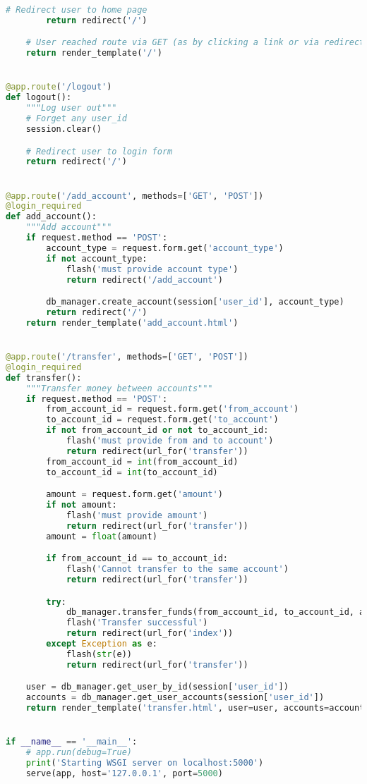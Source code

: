\begin{lstlisting}[language=Python]
		# Redirect user to home page
		return redirect('/')

	# User reached route via GET (as by clicking a link or via redirect)
	return render_template('/')


@app.route('/logout')
def logout():
	"""Log user out"""
	# Forget any user_id
	session.clear()

	# Redirect user to login form
	return redirect('/')


@app.route('/add_account', methods=['GET', 'POST'])
@login_required
def add_account():
	"""Add account"""
	if request.method == 'POST':
		account_type = request.form.get('account_type')
		if not account_type:
			flash('must provide account type')
			return redirect('/add_account')

		db_manager.create_account(session['user_id'], account_type)
		return redirect('/')
	return render_template('add_account.html')


@app.route('/transfer', methods=['GET', 'POST'])
@login_required
def transfer():
	"""Transfer money between accounts"""
	if request.method == 'POST':
		from_account_id = request.form.get('from_account')
		to_account_id = request.form.get('to_account')
		if not from_account_id or not to_account_id:
			flash('must provide from and to account')
			return redirect(url_for('transfer'))
		from_account_id = int(from_account_id)
		to_account_id = int(to_account_id)

		amount = request.form.get('amount')
		if not amount:
			flash('must provide amount')
			return redirect(url_for('transfer'))
		amount = float(amount)

		if from_account_id == to_account_id:
			flash('Cannot transfer to the same account')
			return redirect(url_for('transfer'))

		try:
			db_manager.transfer_funds(from_account_id, to_account_id, amount)
			flash('Transfer successful')
			return redirect(url_for('index'))
		except Exception as e:
			flash(str(e))
			return redirect(url_for('transfer'))

	user = db_manager.get_user_by_id(session['user_id'])
	accounts = db_manager.get_user_accounts(session['user_id'])
	return render_template('transfer.html', user=user, accounts=accounts)


if __name__ == '__main__':
	# app.run(debug=True)
	print('Starting WSGI server on localhost:5000')
	serve(app, host='127.0.0.1', port=5000)

\end{lstlisting}

